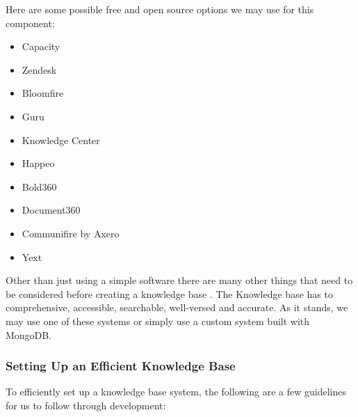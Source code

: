 \documentclass[titlepage, 12pt]{article}
\begin{document}
Here are some possible free and open source options we may use for this component: 

\begin{itemize}
    \item Capacity
    \item Zendesk
    \item Bloomfire
    \item Guru
    \item Knowledge Center
    \item Happeo
    \item Bold360
    \item Document360
    \item Communifire by Axero
    \item Yext
\end{itemize}

Other than just using a simple software there are many other things that need to be considered before creating a knowledge base \cite{bib-2-11}. The Knowledge base has to comprehensive, accessible, searchable, well-versed and accurate. As it stands, we may use one of these systems or simply use a custom system built with MongoDB.

\subsubsection{Setting Up an Efficient Knowledge Base}

To efficiently set up a knowledge base system, the following are a few guidelines for us to follow through development:
\end{document}
